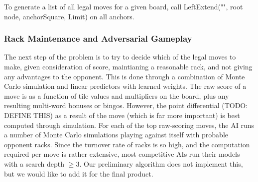 \documentclass[12pt]{article}
\begin{document}
To generate a list of all legal moves for a given board, call
LeftExtend("", root node, anchorSquare, Limit) on all anchors.




\subsubsection{Rack Maintenance and Adversarial Gameplay}
The next step of the problem is to try to decide which of the legal
moves to make, given consideration of score, maintianing a reasonable
rack, and not giving any advantages to the opponent. This is done
through a combination of Monte Carlo simulation and linear predictors
with learned weights. The raw score of a move is as a function of tile
values and multipliers on the board, plus any resulting multi-word
bonuses or bingos. However, the point differential (TODO: DEFINE THIS)
as a result of the move (which is far more important) is best computed
through simulation. For each of the top raw-scoring moves, the AI runs
a number of Monte Carlo simulations playing against itself with
probable opponent racks. Since the turnover rate of racks is so high,
and the computation required per move is rather extensive, most
competitive AIs run their models with a search depth $\geq 3$. Our
preliminary algorithm does not implement this, but we would like to
add it for the final product.
\end{document}
